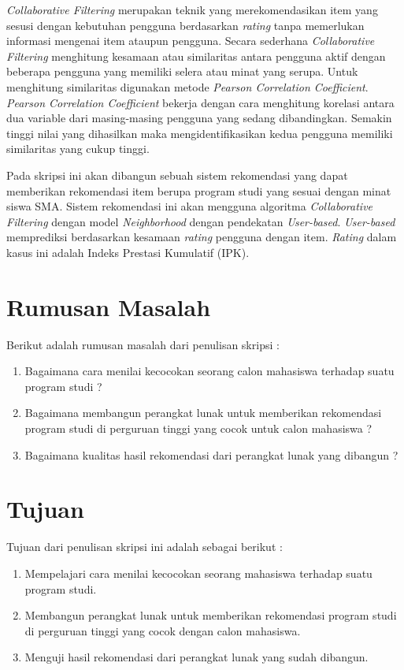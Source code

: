 \documentclass[a4paper,twoside]{article}
\begin{document}
\textit{Collaborative Filtering} merupakan teknik yang merekomendasikan item yang sesusi dengan kebutuhan pengguna berdasarkan \textit{rating} tanpa memerlukan informasi mengenai item ataupun pengguna. Secara sederhana \textit{Collaborative Filtering} menghitung kesamaan atau similaritas antara pengguna aktif dengan beberapa pengguna yang memiliki selera atau minat yang serupa. Untuk menghitung similaritas digunakan metode \textit{Pearson Correlation Coefficient}. \textit{Pearson Correlation Coefficient} bekerja dengan cara menghitung korelasi antara dua variable dari masing-masing pengguna yang sedang dibandingkan. Semakin tinggi nilai yang dihasilkan maka mengidentifikasikan kedua pengguna memiliki similaritas yang cukup tinggi.

Pada skripsi ini akan dibangun sebuah sistem rekomendasi yang dapat memberikan rekomendasi item berupa program studi yang sesuai dengan minat siswa SMA. Sistem rekomendasi ini akan mengguna algoritma \textit{Collaborative Filtering} dengan model \textit{Neighborhood} dengan pendekatan \textit{User-based}. \textit{User-based} memprediksi berdasarkan kesamaan \textit{rating} pengguna dengan item. \textit{Rating} dalam kasus ini adalah Indeks Prestasi Kumulatif (IPK).


\section{Rumusan Masalah}
Berikut adalah rumusan masalah dari penulisan skripsi :

\begin{enumerate}
	\item Bagaimana cara menilai kecocokan seorang calon mahasiswa terhadap suatu program studi ?
	\item Bagaimana membangun perangkat lunak untuk memberikan rekomendasi program studi di perguruan tinggi yang cocok untuk calon mahasiswa ?
	\item Bagaimana kualitas hasil rekomendasi dari perangkat lunak yang dibangun ?
\end{enumerate}

\section{Tujuan}
Tujuan dari penulisan skripsi ini adalah sebagai berikut :

\begin{enumerate}
	\item Mempelajari cara menilai kecocokan seorang mahasiswa terhadap suatu program studi.
	\item Membangun perangkat lunak untuk memberikan rekomendasi program studi di perguruan tinggi yang cocok dengan calon mahasiswa.
	\item Menguji hasil rekomendasi dari perangkat lunak yang sudah dibangun.
\end{enumerate}
\end{document}
